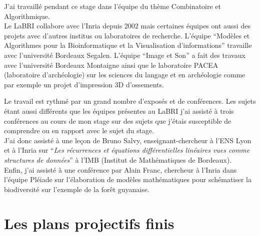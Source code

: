 \documentclass[a4paper]{article}
\begin{document}
J'ai travaillé pendant ce stage dans l'équipe du thème Combinatoire et Algorithmique.\vspace{1\baselineskip}\\
Le LaBRI collabore avec l'Inria depuis 2002 mais certaines équipes ont aussi des projets avec d'autres institus ou laboratoires de recherche. L'équipe ``Modèles et Algorithmes pour la Bioinformatique et la Visualisation d'informations'' travaille avec l'université Bordeaux Segalen. L'équipe ``Image et Son'' a fait des travaux avec l'université Bordeaux Montaigne ainsi que le laboratoire PACEA (laboratoire d'archéologie) sur les sciences du langage et en archéologie comme par exemple un projet d'impression 3D d'ossements. 

Le travail est rythmé par un grand nombre d'exposés et de conférences. Les sujets étant aussi différents que les équipes présentes au LaBRI j'ai assisté à trois conférences au cours de mon stage sur des sujets que j'étais susceptible de comprendre ou en rapport avec le sujet du stage.\\
J'ai donc assisté à une leçon de Bruno Salvy, enseignant-chercheur à l'ENS Lyon et à l'Inria sur ``\textit{Les récurrences et équations différentielles linéaires vues comme structures de données}'' à l'IMB (Institut de Mathématiques de Bordeaux). \\
Enfin, j'ai assisté à une conférence par Alain Franc, chercheur à l'Inria dans l'équipe Pléiade sur l'élaboration de modèles mathématiques pour schématiser la biodiversité sur l'exemple de la forêt guyanaise.

\newpage
\section{Les plans projectifs finis}
\end{document}

